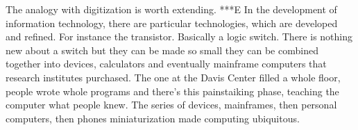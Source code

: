 







 



The analogy with digitization is worth extending.
***E %
In the development of information technology, there are particular technologies, which are developed and refined. For instance the transistor. Basically a logic switch. There is nothing new about a switch but they can be made so small they can be combined together into devices, calculators and eventually mainframe computers that research institutes purchased. The one at the Davis Center filled a whole floor, people wrote whole programs
and there's this painstaiking phase, teaching the computer what people knew.
The series of devices, mainframes, then personal computers, then phones miniaturization made computing ubiquitous.

